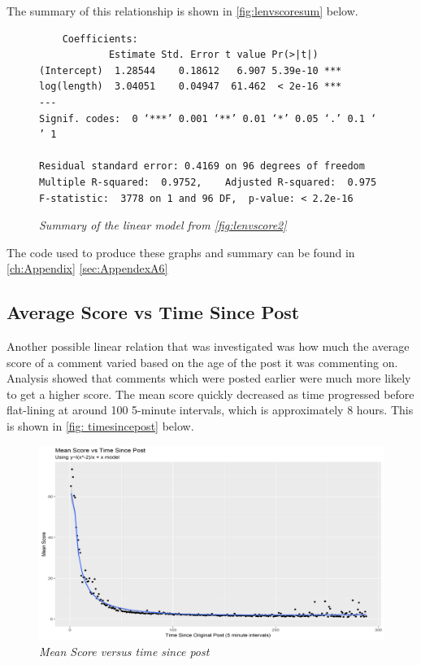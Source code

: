     The summary of this relationship is shown in \autoref{fig:lenvscoresum} below.
    
    \begin{figure}[H]
    \begin{lstlisting}
    Coefficients:
            Estimate Std. Error t value Pr(>|t|)    
(Intercept)  1.28544    0.18612   6.907 5.39e-10 ***
log(length)  3.04051    0.04947  61.462  < 2e-16 ***
---
Signif. codes:  0 ‘***’ 0.001 ‘**’ 0.01 ‘*’ 0.05 ‘.’ 0.1 ‘ ’ 1

Residual standard error: 0.4169 on 96 degrees of freedom
Multiple R-squared:  0.9752,	Adjusted R-squared:  0.975 
F-statistic:  3778 on 1 and 96 DF,  p-value: < 2.2e-16
    \end{lstlisting}
    \caption{\textit{Summary of the linear model from \autoref{fig:lenvscore2}}}
    \label{fig:lenvscoresum}
    \end{figure}
    
The code used to produce these graphs and summary can be found in \autoref{ch:Appendix} \autoref{sec:AppendexA6}


\subsection {Average Score vs Time Since Post}
    Another possible linear relation that was investigated was how much the average score of a comment varied based on the age of the post it was commenting on. Analysis showed that comments which were posted earlier were much more likely to get a higher score. The mean score quickly decreased as time progressed before flat-lining at around 100 5-minute intervals, which is approximately 8 hours. This is shown in \autoref{fig: timesincepost} below.
    
    \begin{figure}[ht]
        \centering
        \includegraphics[width=1.0\textwidth]{graphs/meanscore_vs_time2}
        \caption{\textit{Mean Score versus time since post}}
        \label{fig: timesincepost}
    \end{figure}

